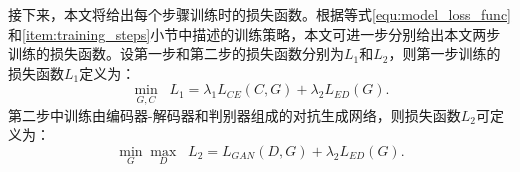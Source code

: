 接下来，本文将给出每个步骤训练时的损失函数。根据等式\ref{equ:model_loss_func}和\ref{item:training_steps}小节中描述的训练策略，本文可进一步分别给出本文两步训练的损失函数。设第一步和第二步的损失函数分别为$L_1$和$L_2$，则第一步训练的损失函数$L_1$定义为：
\begin{equation}
\min_{G, C} \;\; L_{1}=\lambda_1 L_{CE}(C,G) + \lambda_2 L_{ED}(G).
\end{equation}
第二步中训练由编码器-解码器和判别器组成的对抗生成网络，则损失函数$L_2$可定义为：
\begin{equation}
\min_{G} \max_D \;\; L_{2}= L_{GAN}(D,G) + \lambda_2 L_{ED}(G).
\end{equation}

